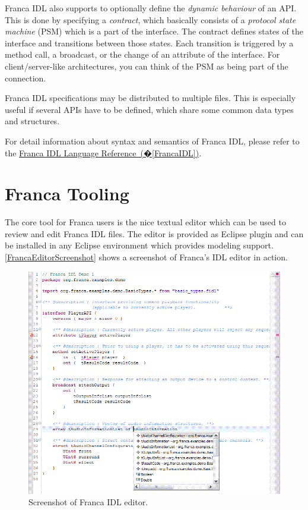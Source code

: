 \documentclass[a4paper,10pt]{scrreprt}
\begin{document}
Franca IDL also supports to optionally define the \textit{dynamic behaviour} of an API.
This is done by specifying a \textit{contract}, which basically consists of a 
\textit{protocol state machine} (PSM) which is a part of the interface.
The contract defines states of the interface and transitions between those states.
Each transition is triggered by a method call, a broadcast, or the change of an
attribute of the interface. For client/server-like architectures, you can think of
the PSM as being part of the connection.      

Franca IDL specifications may be distributed to multiple files.
This is especially useful if several APIs have to be defined, which share some
common data types and structures. 

For detail information about syntax and semantics of Franca IDL, please
refer to the \hyperref[FrancaIDL]{Franca IDL Language Reference~(�\ref*{FrancaIDL})}.

\section{Franca Tooling}
\label{Intro_FrancaTools}
The core tool for Franca users is the nice textual editor which can be used
to review and edit Franca IDL files. The editor is provided as Eclipse plugin
and can be installed in any Eclipse environment which provides modeling support.
\autoref{FrancaEditorScreenshot} shows a screenshot of Franca's IDL editor in action.

\begin{figure}[!ht]
\centering
\includegraphics[width=\textwidth]{images/franca_editor_screenshot_1.png}
\caption{Screenshot of Franca IDL editor.}
\label{FrancaEditorScreenshot}
\end{figure}
\end{document}
